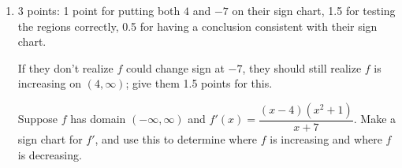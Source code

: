 \documentclass{article}
\begin{document}
\begin{enumerate}
\begin{enumerate}
    \begin{solution}
      This is impossible.
    \end{solution}

  \item
    \begin{problem}[\vfill]
      Sketch an example of a function $f$ that's both continuous at $x = 3$ and differentiable at $x = 3$, or say that it's impossible. 
    \end{problem}

    \begin{solution}
    
    \end{solution}

  \end{enumerate}

\item  \begin{grading}
    3 points: 1 point for putting both $4$ and $-7$ on their sign chart, 1.5 for testing the regions correctly, 0.5 for having a conclusion consistent with their sign chart.

    If they don't realize $f$ could change sign at $-7$, they should still realize $f$ is increasing on $(4, \infty)$; give them 1.5 points for this. 
  \end{grading}

  \begin{problem}[\nstretch{2}]
    Suppose $f$ has domain $(-\infty, \infty)$ and $f'(x) = \dfrac{(x - 4)(x^2 + 1)}{x + 7}$. Make a sign chart for $f'$, and use this to determine where $f$ is increasing and where $f$ is decreasing.
  \end{problem}


\end{enumerate}
\end{document}
